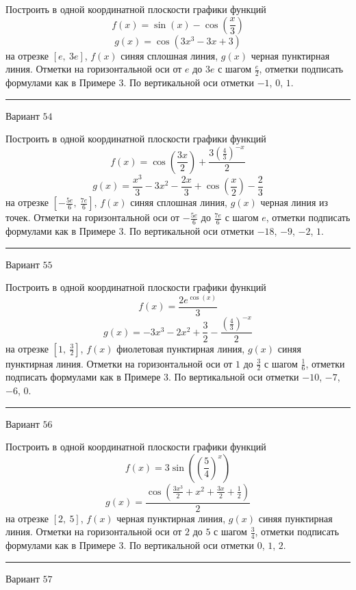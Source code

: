 \documentclass[11pt]{report}
\begin{document}
Построить в одной координатной плоскости графики функций $$f(x) = \sin{\left(x \right)} - \cos{\left(\frac{x}{3} \right)}$$ $$g(x) = \cos{\left(3 x^{3} - 3 x + 3 \right)}$$ на отрезке $\left[e, \  3 e\right]$, $f(x)$ синяя сплошная линия, $g(x)$ черная пунктирная линия. Отметки на горизонтальной оси от $e$ до $3 e$ с шагом $\frac{e}{2}$, отметки подписать формулами как в Примере 3. По вертикальной оси отметки $-1$, $0$, $1$.
\begin{center}
\noindent\rule{8cm}{0.4pt}
\end{center}
Вариант $54$


Построить в одной координатной плоскости графики функций $$f(x) = \cos{\left(\frac{3 x}{2} \right)} + \frac{3 \left(\frac{4}{3}\right)^{- x}}{2}$$ $$g(x) = \frac{x^{3}}{3} - 3 x^{2} - \frac{2 x}{3} + \cos{\left(\frac{x}{2} \right)} - \frac{2}{3}$$ на отрезке $\left[- \frac{5 e}{6}, \  \frac{7 e}{6}\right]$, $f(x)$ синяя сплошная линия, $g(x)$ черная линия из точек. Отметки на горизонтальной оси от $- \frac{5 e}{6}$ до $\frac{7 e}{6}$ с шагом $e$, отметки подписать формулами как в Примере 3. По вертикальной оси отметки $-18$, $-9$, $-2$, $1$.
\begin{center}
\noindent\rule{8cm}{0.4pt}
\end{center}
Вариант $55$


Построить в одной координатной плоскости графики функций $$f(x) = \frac{2 e^{\cos{\left(x \right)}}}{3}$$ $$g(x) = - 3 x^{3} - 2 x^{2} + \frac{3}{2} - \frac{\left(\frac{4}{3}\right)^{- x}}{2}$$ на отрезке $\left[1, \  \frac{3}{2}\right]$, $f(x)$ фиолетовая пунктирная линия, $g(x)$ синяя пунктирная линия. Отметки на горизонтальной оси от $1$ до $\frac{3}{2}$ с шагом $\frac{1}{6}$, отметки подписать формулами как в Примере 3. По вертикальной оси отметки $-10$, $-7$, $-6$, $0$.
\begin{center}
\noindent\rule{8cm}{0.4pt}
\end{center}
Вариант $56$


Построить в одной координатной плоскости графики функций $$f(x) = 3 \sin{\left(\left(\frac{5}{4}\right)^{x} \right)}$$ $$g(x) = \frac{\cos{\left(\frac{3 x^{3}}{2} + x^{2} + \frac{3 x}{2} + \frac{1}{2} \right)}}{2}$$ на отрезке $\left[2, \  5\right]$, $f(x)$ черная пунктирная линия, $g(x)$ синяя пунктирная линия. Отметки на горизонтальной оси от $2$ до $5$ с шагом $\frac{3}{4}$, отметки подписать формулами как в Примере 3. По вертикальной оси отметки $0$, $1$, $2$.
\begin{center}
\noindent\rule{8cm}{0.4pt}
\end{center}
Вариант $57$
\end{document}
